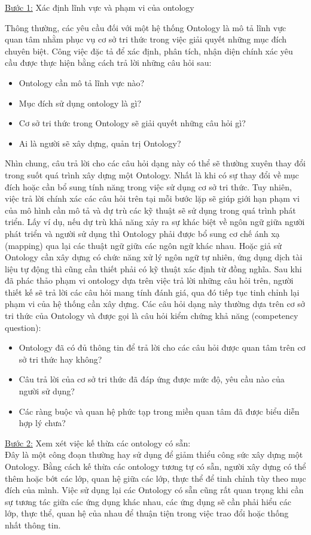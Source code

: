 \underline{Bước 1:} Xác định lĩnh vực và phạm vi của ontology

Thông thường, các yêu cầu đối với một hệ thống Ontology là mô tả lĩnh vực quan tâm nhằm phục vụ cơ sở tri thức trong việc giải quyết những mục đích chuyên biệt. Công việc đặc tả để xác định, phân tích, nhận diện chính xác yêu cầu được thực hiện bằng cách trả lời những câu hỏi sau:
\begin{itemize}
	\item Ontology cần mô tả lĩnh vực nào?
	\item Mục đích sử dụng ontology là gì?
	\item Cơ sở tri thức trong Ontology sẽ giải quyết những câu hỏi gì?
	\item Ai là người sẽ xây dựng, quản trị Ontology?
\end{itemize}
Nhìn chung, câu trả lời cho các câu hỏi dạng này có thể sẽ thường xuyên thay đổi trong suốt quá trình xây dựng một Ontology. Nhất là khi có sự thay đổi về mục đích hoặc cần bổ sung tính năng trong việc sử dụng cơ sở tri thức. Tuy nhiên, việc trả lời chính xác các câu hỏi trên tại mỗi bước lặp sẽ giúp giới hạn phạm vi của mô hình cần mô tả và dự trù các kỹ thuật sẽ sử dụng trong quá trình phát triển. Lấy ví dụ, nếu dự trù khả năng xảy ra sự khác biệt về ngôn ngữ giữa người phát triển và người sử dụng thì Ontology phải được bổ sung cơ chế ánh xạ (mapping) qua lại các thuật ngữ giữa các ngôn ngữ khác nhau. Hoặc giả sử Ontology cần xây dựng có chức năng xử lý ngôn ngữ tự nhiên, ứng dụng dịch tài liệu tự động thì cũng cần thiết phải có kỹ thuật xác định từ đồng nghĩa. Sau khi đã phác thảo phạm vi ontology dựa trên việc trả lời những câu hỏi trên, người thiết kế sẽ trả lời các câu hỏi mang tính đánh giá, qua đó tiếp tục tinh chỉnh lại phạm vi của hệ thống cần xây dựng. Các câu hỏi dạng này thường dựa trên cơ sở tri thức của Ontology và được gọi là câu hỏi kiểm chứng khả năng (competency question):
\begin{itemize}
	\item Ontology đã có đủ thông tin để trả lời cho các câu hỏi được quan tâm trên cơ sở tri thức hay không?
	\item Câu trả lời của cơ sở tri thức đã đáp ứng được mức độ, yêu cầu nào của người sử dụng?
	\item Các ràng buộc và quan hệ phức tạp trong miền quan tâm đã được biểu diễn hợp lý chưa? 
\end{itemize}
\underline{Bước 2:} Xem xét việc kế thừa các ontology có sẵn: \\
Đây là một công đoạn thường hay sử dụng để giảm thiểu công sức xây dựng một Ontology. Bằng cách kế thừa các ontology tương tự có sẵn, người xây dựng có thể thêm hoặc bớt các lớp, quan hệ giữa các lớp, thực thể để tinh chỉnh tùy theo mục đích của mình. Việc sử dụng lại các Ontology có sẵn cũng rất quan trọng khi cần sự tương tác giữa các ứng dụng khác nhau, các ứng dụng sẽ cần phải hiểu các lớp, thực thể, quan hệ của nhau để thuận tiện trong việc trao đổi hoặc thống nhất thông tin.\\

